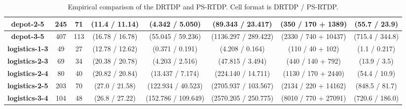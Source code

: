 \documentclass[letterpaper]{article} %
\theoremstyle{remark}
\begin{document}
\begin{table*}[]
\begin{tabular}{|c|c|c||c|c|c|c|c|}
\textbf{depot-2-5}     & 245                 & 71                & (11.4 / 11.14)     & (4.342 / 5.050)                             & (89.343 / 23.417)                         & (350 / 170 + 1389)              & (55.7 / 23.9)             \\ \hline
\textbf{depot-3-5}     & 407                 & 113               & (16.78 / 16.78)    & (55.045 / 59.236)                           & (1136.297 / 289.422)                      & (2330 / 740 + 10437)             & (715.4 / 344.8)           \\ \hline\hline
\textbf{logistics-1-3} & 49                  & 27                & (12.78 / 12.62)    & (0.371 / 0.191)                             & (4.208 / 0.164)                           & (110 / 40 + 102)               & (1.1 / 0.217)             \\ \hline
\textbf{logistics-2-3} & 69                  & 34                & (20.38 / 20.78)    & (4.203 / 2.516)                             & (47.815 / 3.494)                          & (440 / 140 + 792)              & (13.9 / 3.5)              \\ \hline
\textbf{logistics-2-4} & 80                  & 40                & (20.82 / 20.84)    & (13.437 / 7.174)                            & (224.140 / 14.711)                        & (1130 / 170 + 2440)             & (54.4 / 10.9)             \\ \hline
\textbf{logistics-2-5} & 203                 & 70                & (27.0 / 21.58)     & (122.934 / 40.523)                          & (2705.937 / 103.567)                      & (2134 / 220 + 14162)             & (848.5 / 81.7)            \\ \hline
\textbf{logistics-3-4} & 104                 & 48                & (26.8 / 27.22)     & (152.786 / 109.649)                         & (2570.205 / 250.775)                      & (8010 / 770 + 27091)             & (720.6 / 186.0)           \\ \hline
\end{tabular}
\caption{Empirical comparison of the DRTDP and PS-RTDP. Cell format is DRTDP / PS-RTDP.}
\label{tbl:results}
\end{table*}
\end{document}
